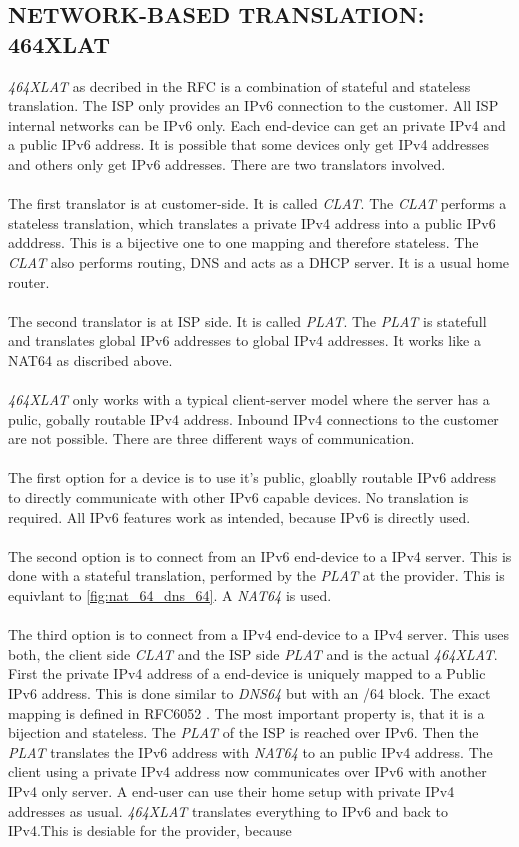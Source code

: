 \documentclass[format=sigconf, natbib=true, nonacm=true]{acmart}
\begin{document}
    \subsection{NETWORK-BASED TRANSLATION: 464XLAT}
    \textit{464XLAT} as decribed in the RFC \cite{rfc6877} is a combination of stateful and stateless translation. The ISP only provides an IPv6 connection to the customer. All ISP internal networks can be IPv6 only. Each end-device can get an private IPv4 and a public IPv6 address. It is possible that some devices only get IPv4 addresses and others only get IPv6 addresses. There are two translators involved.\\\\The first translator is at customer-side. It is called \textit{CLAT}. The \textit{CLAT} performs a stateless translation, which translates a private IPv4 address into a public IPv6 adddress. This is a bijective one to one mapping and therefore stateless. The \textit{CLAT} also performs routing, DNS and acts as a DHCP server. It is a usual home router.\\\\The second translator is at ISP side. It is called \textit{PLAT}. The \textit{PLAT} is statefull and translates global IPv6 addresses to global IPv4 addresses. It works like a NAT64 as discribed above.\\\\\textit{464XLAT} only works with a typical client-server model where the server has a pulic, gobally routable IPv4 address. Inbound IPv4 connections to the customer are not possible. There are three different ways of communication.\\\\The first option for a device is to use it's public, gloablly routable IPv6 address to directly communicate with other IPv6 capable devices. No translation is required. All IPv6 features work as intended, because IPv6 is directly used.\\\\The second option is to connect from an IPv6 end-device to a IPv4 server. This is done with a stateful translation, performed by the \textit{PLAT} at the provider. This is equivlant to \ref{fig:nat_64_dns_64}. A \textit{NAT64} is used.\\\\The third option is to connect from a IPv4 end-device to a IPv4 server. This uses both, the client side \textit{CLAT} and the ISP side \textit{PLAT} and is the actual \textit{464XLAT}. First the private IPv4 address of a end-device is uniquely mapped to a Public IPv6 address. This is done similar to \textit{DNS64} but with an /64 block. The exact mapping is defined in RFC6052 \cite{rfc6052}. The most important property is, that it is a bijection and stateless. The \textit{PLAT} of the ISP is reached over IPv6. Then the \textit{PLAT} translates the IPv6 address with \textit{NAT64} to an public IPv4 address. The client using a private IPv4 address now communicates over IPv6 with another IPv4 only server. A end-user can use their home setup with private IPv4 addresses as usual. \textit{464XLAT} translates everything to IPv6 and back to IPv4.This is desiable for the provider, because 
\end{document}
